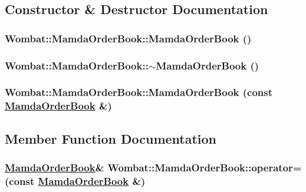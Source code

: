\subsection{Constructor \& Destructor Documentation}
\hypertarget{classWombat_1_1MamdaOrderBook_f4f51e3c305a568ce36a070b99c95ef3}{
\subsubsection[MamdaOrderBook]{\setlength{\rightskip}{0pt plus 5cm}Wombat::Mamda\-Order\-Book::Mamda\-Order\-Book ()}}
\label{classWombat_1_1MamdaOrderBook_f4f51e3c305a568ce36a070b99c95ef3}


\hypertarget{classWombat_1_1MamdaOrderBook_66f03ee08a5eb88f478abd4b03208d2e}{
\subsubsection[$\sim$MamdaOrderBook]{\setlength{\rightskip}{0pt plus 5cm}Wombat::Mamda\-Order\-Book::$\sim$Mamda\-Order\-Book ()}}
\label{classWombat_1_1MamdaOrderBook_66f03ee08a5eb88f478abd4b03208d2e}


\hypertarget{classWombat_1_1MamdaOrderBook_90af371ee3290354fe13e5367b752bba}{
\subsubsection[MamdaOrderBook]{\setlength{\rightskip}{0pt plus 5cm}Wombat::Mamda\-Order\-Book::Mamda\-Order\-Book (const \hyperlink{classWombat_1_1MamdaOrderBook}{Mamda\-Order\-Book} \&)}}
\label{classWombat_1_1MamdaOrderBook_90af371ee3290354fe13e5367b752bba}




\subsection{Member Function Documentation}
\hypertarget{classWombat_1_1MamdaOrderBook_846c46ab40d3365678d59c2fa9273f77}{
\subsubsection[operator=]{\setlength{\rightskip}{0pt plus 5cm}\hyperlink{classWombat_1_1MamdaOrderBook}{Mamda\-Order\-Book}\& Wombat::Mamda\-Order\-Book::operator= (const \hyperlink{classWombat_1_1MamdaOrderBook}{Mamda\-Order\-Book} \&)}}
\label{classWombat_1_1MamdaOrderBook_846c46ab40d3365678d59c2fa9273f77}


